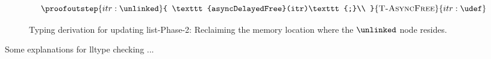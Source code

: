 \begin{figure*}\small
  \[
  \proofoutstep{itr:\unlinked}{
    \texttt{asyncDelayedFree}(itr)\texttt{;}\\
  }{\textsc{T-AsyncFree}}
               {itr:\udef}
               \]
\caption{Typing derivation for updating list-Phase-2: Reclaiming the memory location where the $\unlinked$ node resides.}
\label{fig:update-ll}
\end{figure*}
\begin{comment}
  In \ref{lst:typcheckread}, there exists only one command which touches to a RCU variable, \textsf{itr}, which has RCU qualified type, \textsf{rcuIterator}. Informally, while iterating  over linked list with one iterator, we set it to show next heap location and invalidate the pointer showing the next previous location on heap. To achieve this as type safe, type of \textsf{itr} needs to be preserved as \textsf{rcuIterator} which is checked against \texttt{Overwrite-Curr} typing rule in figure \ref{fig:typingrulesRCURead}.
  
In listing ~\ref{lst:typcheckwrite}, we use two iterators to delete a node. We want these two iterators, \textsf{itr} and \textsf{prev} , to be showing the consecutive heap locations. This property is checked with first assertion in the loop against  \texttt{Write-Traverse} typing rule in figure ~\ref{fig:typingrulesRCUWrite}. Once the node, representing a heap location in linked list, to be deleted is found then it is unlinked. We check the change in state of types due to unlinking a node againsts \texttt{Unlink-Node} typing rule. Once all reader threads are done with the unlinked node, RCU runtime call asynchronous memory reclamation call, \textsf{asyncFree}, and adds the node to the free list. To add a node to a free list, it must be in \textsf{unlinked} type. After the node gets added to free list, its type becomes \textsf{undef}. The last assertion which checks this type property against \texttt{Free-Unlinked-Node} typing rule.
\end{comment}
Some explanations for lltype checking ...
\newpage
